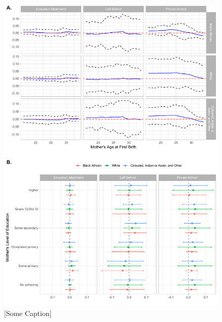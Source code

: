 \documentclass[11pt,a4paper]{article}
\begin{document}
\begin{figure}[h!]
\centering
\caption{\label{fig:06}[Some Caption]}
\includegraphics[width=\textwidth]{figures/heter1.pdf}
\end{figure}
\end{document}
